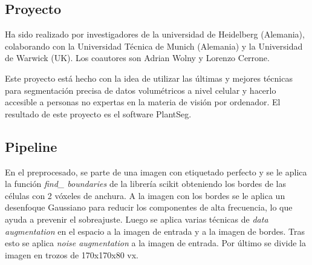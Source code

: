 \subsection{Proyecto}

Ha sido realizado por investigadores de la universidad de Heidelberg (Alemania), colaborando con la Universidad Técnica de Munich (Alemania) y la Universidad de Warwick (UK). Los coautores son Adrian Wolny y Lorenzo Cerrone.\cite{Wolny2020}

Este proyecto está hecho con la idea de utilizar las últimas y mejores técnicas para segmentación precisa de datos volumétricos a nivel celular y hacerlo accesible a personas no expertas en la materia de visión por ordenador. El resultado de este proyecto es el software PlantSeg.

\subsection{Pipeline}


En el preprocesado, se parte de una imagen con etiquetado perfecto y se le aplica la función \textit{find\_ boundaries} de la librería scikit \cite{Pedregosa2011} \cite{Walt2014} obteniendo los bordes de las células con 2 vóxeles de anchura. A la imagen con los bordes se le aplica un desenfoque Gaussiano para reducir los componentes de alta frecuencia, lo que ayuda a prevenir el sobreajuste. Luego se aplica varias técnicas de \textit{data augmentation} en el espacio a la imagen de entrada y a la imagen de bordes. Tras esto se aplica \textit{noise augmentation} a la imagen de entrada. Por último se divide la imagen en trozos de 170x170x80 vx.

